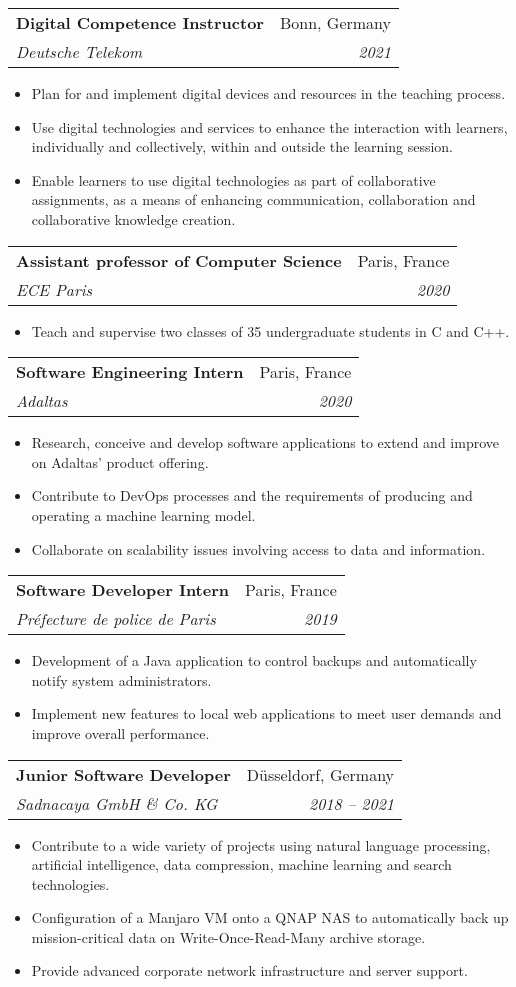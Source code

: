 \documentclass[a4paper,11pt]{article}
\makeatletter
\newcommand{\resumeItem}[2]{
  \item\small{
    \textbf{#1}{ #2 \vspace{-2pt}}
  }
}
\newcommand{\resumeSubheading}[4]{
  \vspace{-1pt}\item
    \begin{tabular*}{0.97\textwidth}{l@{\extracolsep{\fill}}r}
      \textbf{#1} & #2 \\
      \textit{\small#3} & \textit{\small #4} \\
    \end{tabular*}\vspace{-5pt}
}
\newcommand{\resumeItemListStart}{\begin{itemize}}
\newcommand{\resumeItemListEnd}{\end{itemize}\vspace{-5pt}}
\makeatother
\begin{document}
    \resumeSubheading
      {Digital Competence Instructor}{Bonn, Germany}
      {Deutsche Telekom}{2021}
      \resumeItemListStart
        \resumeItem{}
          {Plan for and implement digital devices and resources in the teaching process.}
        \resumeItem{}
          {Use digital technologies and services to enhance the interaction with learners, individually and collectively, within and outside the learning session.}
        \resumeItem{}
          {Enable learners to use digital technologies as part of collaborative assignments, as a means of enhancing communication, collaboration and collaborative knowledge creation.}
    \resumeItemListEnd
  
    \resumeSubheading
      {Assistant professor of Computer Science}{Paris, France}
      {ECE Paris}{2020}
      \resumeItemListStart
        \resumeItem{}
          {Teach and supervise two classes of 35 undergraduate students in C and C++.}
    \resumeItemListEnd

    \resumeSubheading
      {Software Engineering Intern}{Paris, France}
      {Adaltas}{2020}
      \resumeItemListStart
        \resumeItem{}
          {Research, conceive and develop software applications to extend and improve on Adaltas' product offering.}
        \resumeItem{}
          {Contribute to DevOps processes and the requirements of producing and operating a machine learning model.}
        \resumeItem{}
          {Collaborate on scalability issues involving access to data and information.}
      \resumeItemListEnd
  
    \resumeSubheading
      {Software Developer Intern}{Paris, France}
      {Préfecture de police de Paris}{2019}
      \resumeItemListStart
        \resumeItem{}
          {Development of a Java application to control backups and automatically notify system administrators.}
        \resumeItem{}
          {Implement new features to local web applications to meet user demands and improve overall performance.}
      \resumeItemListEnd

    \resumeSubheading
      {Junior Software Developer}{Düsseldorf, Germany}
      {Sadnacaya GmbH \& Co. KG}{2018 -- 2021}
      \resumeItemListStart
        \resumeItem{}
          {Contribute to a wide variety of projects using natural language processing, artificial intelligence, data compression, machine learning and search technologies.}
        \resumeItem{}
          {Configuration of a Manjaro VM onto a QNAP NAS to automatically back up mission-critical data on Write-Once-Read-Many archive storage.}
        \resumeItem{}
          {Provide advanced corporate network infrastructure and server support.}
      \resumeItemListEnd
      
\end{document}
